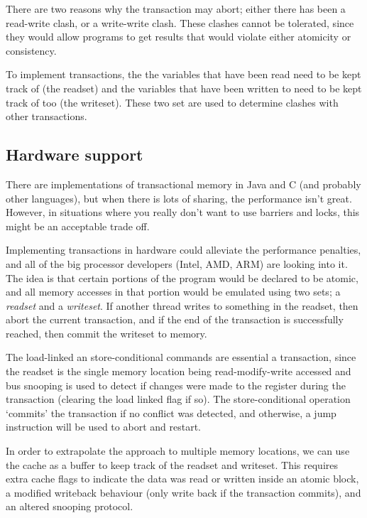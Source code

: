 There are two reasons why the transaction may abort; either there has
been a read-write clash, or a write-write clash. These clashes cannot
be tolerated, since they would allow programs to get results that
would violate either atomicity or consistency.

To implement transactions, the the variables that have been read need
to be kept track of (the readset) and the variables that have been
written to need to be kept track of too (the writeset). These two set
are used to determine clashes with other transactions.


\subsection{Hardware support}

There are implementations of transactional memory in Java and C (and
probably other languages), but when there is lots of sharing, the
performance isn't great. However, in situations where you really don't
want to use barriers and locks, this might be an acceptable trade off.

Implementing transactions in hardware could alleviate the performance
penalties, and all of the big processor developers (Intel, AMD, ARM)
are looking into it. The idea is that certain portions of the program
would be declared to be atomic, and all memory accesses in that
portion would be emulated using two sets; a \textit{readset} and
a \textit{writeset}. If another thread writes to something in the
readset, then abort the current transaction, and if the end of the
transaction is successfully reached, then commit the writeset to
memory.

The load-linked an store-conditional commands are essential a
transaction, since the readset is the single memory location being
read-modify-write accessed and bus snooping is used to detect if
changes were made to the register during the transaction (clearing the
load linked flag if so). The store-conditional operation `commits' the
transaction if no conflict was detected, and otherwise, a jump
instruction will be used to abort and restart.

In order to extrapolate the approach to multiple memory locations, we
can use the cache as a buffer to keep track of the readset and
writeset. This requires extra cache flags to indicate the data was
read or written inside an atomic block, a modified writeback behaviour
(only write back if the transaction commits), and an altered snooping
protocol.

